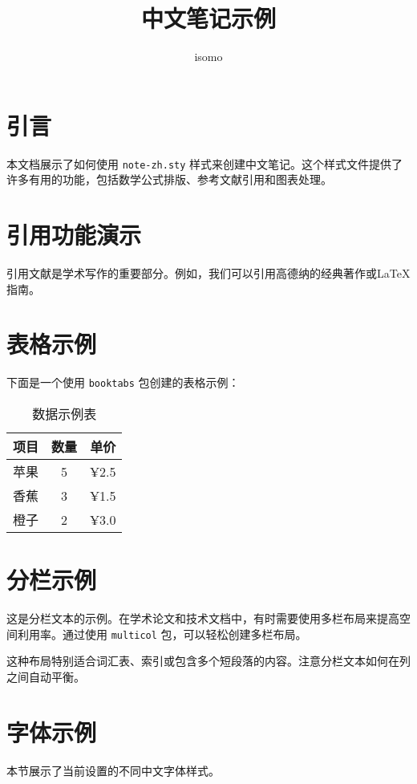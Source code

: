 \documentclass{article}
\title{中文笔记示例}
\author{isomo}
\begin{document}
\maketitle

\section{引言}
本文档展示了如何使用 \texttt{note-zh.sty} 样式来创建中文笔记。这个样式文件提供了许多有用的功能，包括数学公式排版、参考文献引用和图表处理。


\section{引用功能演示}
引用文献是学术写作的重要部分。例如，我们可以引用高德纳的经典著作\cite{knuth1984texbook}或LaTeX指南\cite{lamport1994latex}。

\section{表格示例}
下面是一个使用 \texttt{booktabs} 包创建的表格示例：

\begin{table}[htbp]
  \centering
  \caption{数据示例表}
  \begin{tabular}{lcc}
    \toprule
    项目 & 数量 & 单价 \\
    \midrule
    苹果 & 5 & ¥2.5 \\
    香蕉 & 3 & ¥1.5 \\
    橙子 & 2 & ¥3.0 \\
    \bottomrule
  \end{tabular}
\end{table}

\section{分栏示例}
\begin{multicols}{2}
  这是分栏文本的示例。在学术论文和技术文档中，有时需要使用多栏布局来提高空间利用率。通过使用 \texttt{multicol} 包，可以轻松创建多栏布局。

  这种布局特别适合词汇表、索引或包含多个短段落的内容。注意分栏文本如何在列之间自动平衡。
\end{multicols}

\section{字体示例}
本节展示了当前设置的不同中文字体样式。
\end{document}
